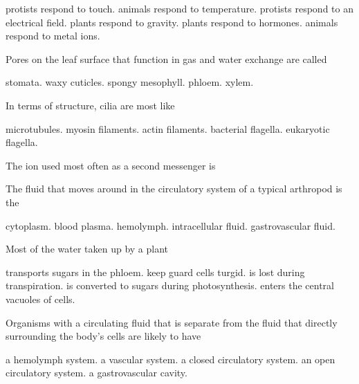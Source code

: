 \begin{choices}
\choice protists respond to touch. 
\choice animals respond to temperature. 
\correctchoice protists respond to an electrical field. 
\choice plants respond to gravity.  
\choice plants respond to hormones. 
\choice animals respond to metal ions. 
\end{choices}

\question
Pores on the leaf surface that function in gas and water exchange are called

\begin{choices}
\correctchoice stomata. 
\choice waxy cuticles. 
\choice spongy mesophyll. 
\choice phloem. 
\choice xylem. 
\end{choices}

\question
In terms of structure, cilia  are most like 
\begin{choices}
\choice microtubules.  
\choice myosin filaments. 
\choice actin filaments. 
\choice bacterial flagella. 
\correctchoice eukaryotic flagella. 
\end{choices}

\question
The ion used most often as a second messenger is

\begin{choices}
\choice {} 
\choice {} 
\choice {} 
\choice {} 
\correctchoice {} 
\end{choices}

\question
The fluid that moves around in the circulatory system of a typical arthropod is the

\begin{choices}
\choice cytoplasm. 
\choice blood plasma. 
\correctchoice hemolymph. 
\choice intracellular fluid. 
\choice gastrovascular fluid. 
\end{choices}

\question
Most of the water taken up by a plant

\begin{choices}
\choice transports sugars in the phloem. 
\choice keep guard cells turgid. 
\correctchoice is lost during transpiration. 
\choice is converted to sugars during photosynthesis. 
\choice enters the central vacuoles of cells.  
\end{choices}

\question
Organisms with a circulating fluid that is separate from the fluid that directly surrounding the body's cells are likely to have

\begin{choices}
\choice a hemolymph system. 
\choice a vascular system. 
\correctchoice a closed circulatory system. 
\choice an open circulatory system. 
\choice a gastrovascular cavity. 
\end{choices}

